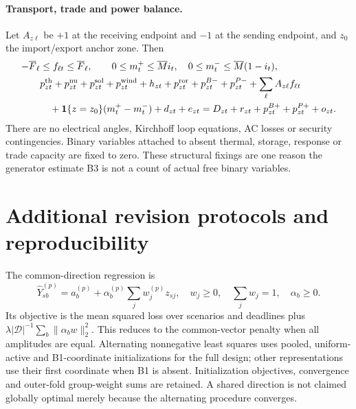 \paragraph{Transport, trade and power balance.}
Let $A_{z\ell}$ be $+1$ at the receiving endpoint and $-1$ at the sending
endpoint, and $z_0$ the import/export anchor zone. Then
\begin{align}
 -\overline F_\ell&\le f_{\ell t}\le\overline F_\ell,\qquad
 0\le m^+_t\le\overline M i_t,\quad0\le m^-_t\le\overline M(1-i_t),\\
 &p^{\rm th}_{zt}+p^{\rm nu}_{zt}+p^{\rm sol}_{zt}+p^{\rm wind}_{zt}
 +h_{zt}+p^{\rm ror}_{zt}+p^{B-}_{zt}+p^{P-}_{zt}
 +\sum_\ell A_{z\ell}f_{\ell t}\nonumber\\
 &\quad+\mathbf{1}\{z=z_0\}(m^+_t-m^-_t)+d_{zt}+e_{zt}
 =D_{zt}+r_{zt}+p^{B+}_{zt}+p^{P+}_{zt}+o_{zt}.
\end{align}
There are no electrical angles, Kirchhoff loop equations, AC losses or
security contingencies. Binary variables attached to absent thermal,
storage, response or trade capacity are fixed to zero. These structural
fixings are one reason the generator estimate B3 is not a count of actual
free binary variables.

\section{Additional revision protocols and reproducibility}
\label{app:revision_protocol}
The common-direction regression is
\begin{equation}
 \widehat Y^{(p)}_{sb}=a^{(p)}_b+\alpha^{(p)}_b\sum_jw^{(p)}_jz_{sj},
 \quad w_j\ge0,\quad\sum_jw_j=1,\quad\alpha_b\ge0.
\end{equation}
Its objective is the mean squared loss over scenarios and deadlines plus
$\lambda |\mathcal D|^{-1}\sum_b\|\alpha_bw\|_2^2$. This reduces to the
common-vector penalty when all amplitudes are equal. Alternating
nonnegative least squares uses pooled, uniform-active and B1-coordinate
initializations for the full design; other representations use their first
coordinate when B1 is absent. Initialization objectives, convergence and
outer-fold group-weight sums are retained. A shared direction is not
claimed globally optimal merely because the alternating procedure converges.

